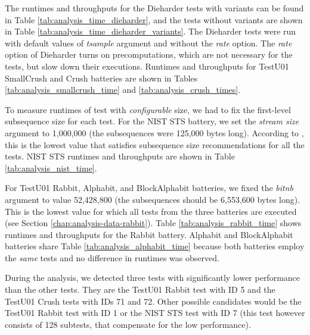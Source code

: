 \documentclass[
  digital,     %
  oneside,     %
  nosansbold,  %
  nocolorbold, %
  nolof,         %
  nolot,         %
]{fithesis4}
\begin{document}
The runtimes and throughputs for the Dieharder tests with variants can be found in Table \ref{tab:analysis_time_dieharder}, and the tests without variants are shown in Table \ref{tab:analysis_time_dieharder_variants}. The Dieharder tests were run with default values of \emph{tsample} argument and without the \emph{rate} option. The \emph{rate} option of Dieharder turns on precomputations, which are not necessary for the tests, but slow down their executions. Runtimes and throughputs for TestU01 SmallCrush and Crush batteries are shown in Tables \ref{tab:analysis_smallcrush_time} and \ref{tab:analysis_crush_times}.

To measure runtimes of test with \emph{configurable} size, we had to fix the first-level subsequence size for each test. For the NIST STS battery, we set the \emph{stream size} argument to 1,000,000 (the subsequences were 125,000  bytes long). According to \cite{nist_special}, this is the lowest value that satisfies subsequence size recommendations for all the tests. NIST STS runtimes and throughputs are shown in Table \ref{tab:analysis_nist_time}.

For TestU01 Rabbit, Alphabit, and BlockAlphabit batteries, we fixed the \emph{bit\textunderscore nb} argument to value 52,428,800 (the subsequences should be 6,553,600 bytes long). This is the lowest value for which all tests from the three batteries are executed (see Section \ref{chap:analysis-data-rabbit}). Table \ref{tab:analysis_rabbit_time} shows runtimes and throughputs for the Rabbit battery. Alphabit and BlockAlphabit batteries share Table \ref{tab:analysis_alphabit_time} because both batteries employ the \emph{same} tests and no difference in runtimes was observed.

During the analysis, we detected three tests with significantly lower performance than the other tests. They are the TestU01 Rabbit test with ID 5 and the TestU01 Crush tests with IDs 71 and 72. Other possible candidates would be the TestU01 Rabbit test with ID 1 or the NIST STS test with ID 7 (this test however consists of 128 subtests, that compensate for the low performance).
\end{document}
